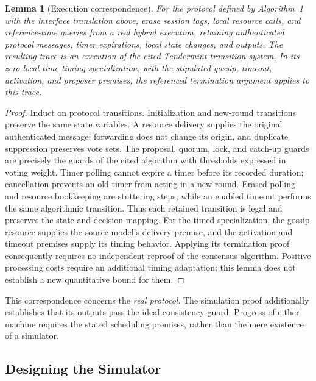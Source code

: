 \documentclass[conference,letterpaper,10pt]{IEEEtran}
\newtheorem{lemma}{Lemma}
\begin{document}
\begin{lemma}[Execution correspondence]\label{lem:execution-correspondence}
For the protocol defined by Algorithm~1 with the interface translation above, erase session tags, local resource calls, and reference-time queries from a real hybrid execution, retaining authenticated protocol messages, timer expirations, local state changes, and outputs. The resulting trace is an execution of the cited Tendermint transition system. In its zero-local-time timing specialization, with the stipulated gossip, timeout, activation, and proposer premises, the referenced termination argument applies to this trace.
\end{lemma}
\begin{proof}
Induct on protocol transitions. Initialization and new-round transitions preserve the same state variables. A resource delivery supplies the original authenticated message; forwarding does not change its origin, and duplicate suppression preserves vote sets. The proposal, quorum, lock, and catch-up guards are precisely the guards of the cited algorithm with thresholds expressed in voting weight. Timer polling cannot expire a timer before its recorded duration; cancellation prevents an old timer from acting in a new round. Erased polling and resource bookkeeping are stuttering steps, while an enabled timeout performs the same algorithmic transition. Thus each retained transition is legal and preserves the state and decision mapping. For the timed specialization, the gossip resource supplies the source model's delivery premise, and the activation and timeout premises supply its timing behavior. Applying its termination proof consequently requires no independent reproof of the consensus algorithm. Positive processing costs require an additional timing adaptation; this lemma does not establish a new quantitative bound for them.
\end{proof}

This correspondence concerns the \emph{real protocol}. The simulation proof additionally establishes that its outputs pass the ideal consistency guard. Progress of either machine requires the stated scheduling premises, rather than the mere existence of a simulator.

\subsection{Designing the Simulator}\label{subsec:simulator}
\end{document}
